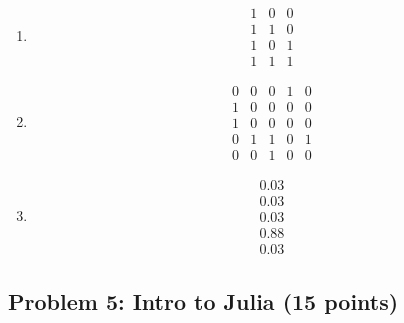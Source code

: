 \documentclass[]{article}
\begin{document}
\begin{enumerate}
\def\labelenumi{\arabic{enumi}.}
\item
$$
\begin{matrix}
1 & 0 & 0 \\
1 & 1 & 0 \\
1 & 0 & 1 \\
1 & 1 & 1
\end{matrix} 
$$

\item
  $$
  \begin{matrix}
  0 & 0 & 0 & 1 & 0 \\
  1 & 0 & 0 & 0 & 0 \\
  1 & 0 & 0 & 0 & 0 \\
  0 & 1 & 1 & 0 & 1 \\
  0 & 0 & 1 & 0 & 0
  \end{matrix} 
  $$
  
\item
    $$
    \begin{matrix}
    0.03 \\
    0.03\\
    0.03\\
    0.88\\
    0.03 
    \end{matrix} 
    $$
\end{enumerate}




\subsection{Problem 5: Intro to Julia (15
points)}\label{problem-5-intro-to-julia-15-points}
\end{document}
